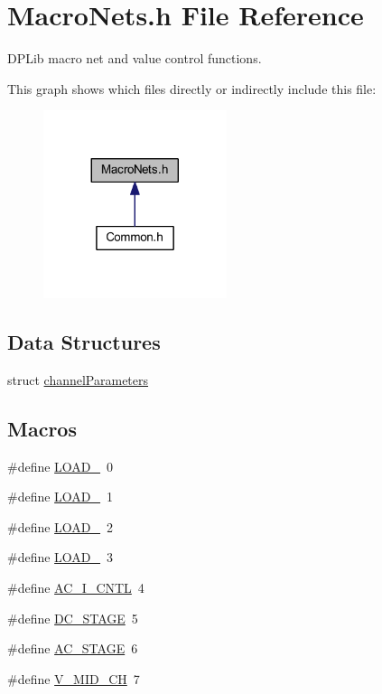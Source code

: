 \hypertarget{a00021}{\section{Macro\-Nets.\-h File Reference}
\label{a00021}
}


D\-P\-Lib macro net and value control functions.  


This graph shows which files directly or indirectly include this file\-:\nopagebreak
\begin{figure}[H]
\begin{center}
\leavevmode
\includegraphics[width=152pt]{a00050}
\end{center}
\end{figure}
\subsection*{Data Structures}
\begin{DoxyCompactItemize}
\item 
struct \hyperlink{a00003}{channel\-Parameters}
\end{DoxyCompactItemize}
\subsection*{Macros}
\begin{DoxyCompactItemize}
\item 
\#define \hyperlink{a00021_a007a209cd2e2b935be1f69218652edc1}{L\-O\-A\-D\-\_}~0
\item 
\#define \hyperlink{a00021_a363f09c63f2ecb9086b47d72a3f3f57d}{L\-O\-A\-D\-\_}~1
\item 
\#define \hyperlink{a00021_af7c1e96216e7b48160e5a03afe8ac807}{L\-O\-A\-D\-\_}~2
\item 
\#define \hyperlink{a00021_a2c862ec4115c4a016b61800609f236a7}{L\-O\-A\-D\-\_}~3
\item 
\#define \hyperlink{a00021_ab875424e7a295e6a0eae1605b3285adb}{A\-C\-\_\-\-I\-\_\-\-C\-N\-T\-L}~4
\item 
\#define \hyperlink{a00021_af3967a451ed4068ca1cbf55dd2de3799}{D\-C\-\_\-\-S\-T\-A\-G\-E}~5
\item 
\#define \hyperlink{a00021_a3fc4318ae73eae35339f616047300b0f}{A\-C\-\_\-\-S\-T\-A\-G\-E}~6
\item 
\#define \hyperlink{a00021_a1ae2d3caef45c64fbb9175c50c27ce09}{V\-\_\-\-M\-I\-D\-\_\-\-C\-H}~7
\end{DoxyCompactItemize}
